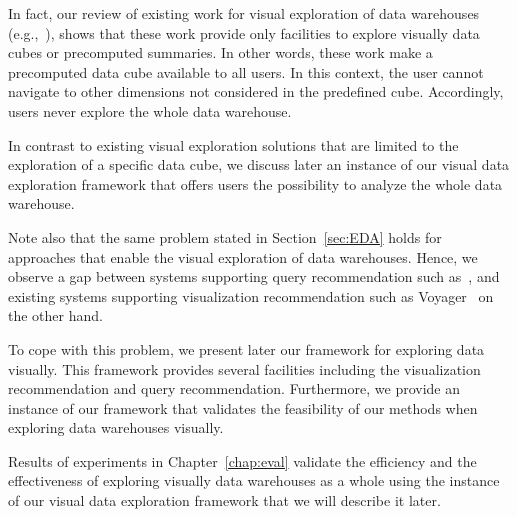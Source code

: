 In fact, our review of existing work for visual exploration of data warehouses (e.g.,~\cite{Vartak,Ehsan:18,MafrurSK18,Tang:2017,Milo:2016,Milo:2018,Sellam:16,Wongsuphasawat2016,Wongsuphasawat:2017}), shows that these work provide only facilities to explore visually data cubes or precomputed summaries. 
In other words, these work make a precomputed data cube available to all users. In this context, the user cannot navigate to other dimensions not considered in the predefined cube. Accordingly, users never explore the whole data warehouse.

In contrast to existing visual exploration solutions that are limited to the exploration of a specific data cube, we  discuss later an instance of our visual data exploration framework that offers users the possibility to analyze the whole data warehouse.

Note also that the same problem stated in Section~\ref{sec:EDA} holds for approaches that enable the visual exploration of data warehouses. Hence, we observe a gap between systems supporting query recommendation such as~\cite{Vartak,Ehsan:18,MafrurSK18,Sellam:16,Tang:2017,Milo:2016,Milo:2018}, and existing systems supporting visualization recommendation such as Voyager~\cite{Wongsuphasawat2016,Wongsuphasawat:2017,url:tableau,url:QlikView} on the other hand.



To cope with this problem, we present later our framework for exploring data visually. 
This framework provides several facilities including the visualization recommendation and query recommendation. Furthermore, we provide an instance of our framework that validates the feasibility of our methods when exploring data warehouses visually. 

Results of experiments in Chapter~\ref{chap:eval} validate the efficiency and the effectiveness of exploring visually data warehouses as a whole using the instance of our visual data exploration framework that we will describe it later.










